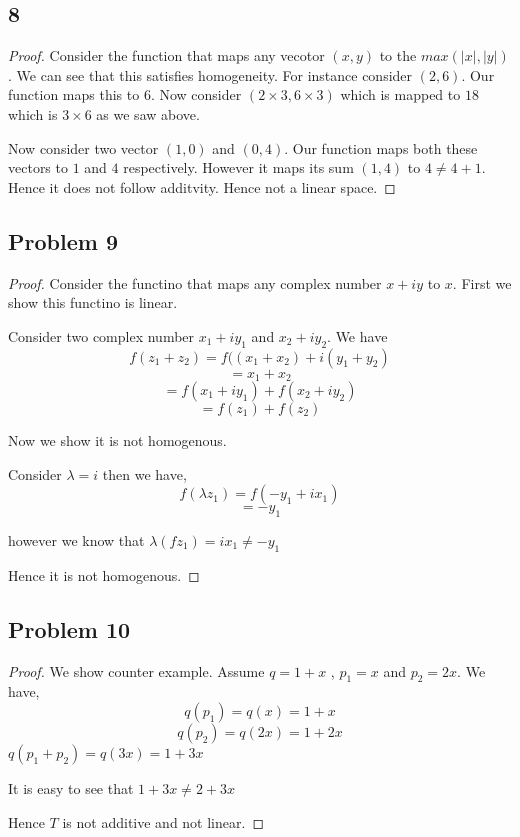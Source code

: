 \documentclass[a4paper]{report}
\begin{document}
\subsection*{8}
\begin{proof}
    Consider the function that maps any vecotor $(x,y)$ to the $max(|x|,|y|)$. We can see that this satisfies homogeneity. For instance consider  $(2,6)$. Our function maps this to  $6$. Now consider  $(2 \times 3, 6 \times 3)$  which is mapped to $18$ which is  $3 \times  6$ as we saw above. 

    Now consider two vector $(1,0)$ and  $(0,4)$. Our function maps both these vectors to  $1$ and $4$ respectively. However it maps its sum  $(1,4)$ to  $4 \ne 4 + 1$. Hence it does not follow additvity. Hence not a linear space.
\end{proof}


\subsection*{Problem 9}
\begin{proof}
    Consider the functino that maps any complex number $x + iy$ to $x$. First we show this functino is linear.

    Consider two complex number $x_1 + iy_1$ and $x_2 + iy_2$. We have $$f(z_1 + z_2) = f((x_1 + x_2) + i(y_1 + y_2)$$
    $$ = x_1 + x_2 $$ 
    $$ = f(x_1 + iy_1) + f(x_2 + iy_2) $$ 
    $$ = f(z_1) + f(z_2) $$ 

    Now we show it is not homogenous.
    
    Consider $\lambda = i$ then we have,  
    $$ f(\lambda z_1) = f(-y_1 + ix_1) $$ 
    $$ = -y_1 $$ 

    however we know that $\lambda (fz_1) =  ix_1 \ne -y_1$

    Hence it is not homogenous.



\end{proof}

\subsection*{Problem 10}
\begin{proof}
    We show counter example. Assume $q = 1 + x$ ,  $p_1 = x$ and $p_2 = 2x$. We have, 
    $$ q(p_1) = q(x) = 1 + x $$ 
    $$ q(p_2) = q(2x) = 1 + 2x $$ 
    $q(p_1 + p_2) = q(3x) = 1 + 3x$

    It is easy to see that $1 + 3x \ne 2 + 3x$

    Hence  $T$ is not additive and not linear.
\end{proof}
\end{document}
